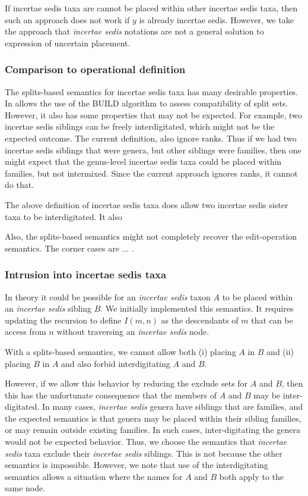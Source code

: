 \documentclass[english]{article}
\begin{document}
If incertae sedis taxa are cannot be placed within other incertae
sedis taxa, then such an approach does not work if $y$ is already
incertae sedis.
However, we take the approach that \emph{incertae
sedis} notations are not a general solution to expression of uncertain
placement.

\subsubsection{Comparison to operational definition}

The splits-based semantics for incertae sedis taxa has many desirable
properties.
In allows the use of the BUILD algorithm to assess
compatibility of split sets.
However, it also has some properties that
may not be expected.
For example, two incertae sedis siblings can be
freely interdigitated, which might not be the expected outcome.
The
current definition, also ignore ranks.
Thus if we had two incertae
sedis siblings that were genera, but other siblings were families,
then one might expect that the genus-level incertae sedis taxa could
be placed within families, but not intermixed.
Since the current
approach ignores ranks, it cannot do that.

The above definition of incertae sedis taxa does allow two incertae
sedis sister taxa to be interdigitated.
It also

Also, the splits-based semantics might not completely recover the
edit-operation semantics.
The corner cases are ...
.

\subsubsection{Intrusion into incertae sedis taxa}

In theory it could be possible for an \emph{incertae sedis} taxon $A$
to be placed within an \emph{incertae sedis} sibling $B$.
We initially
implemented this semantics.
It requires updating the recursion to
define $I(m,n)$ as the descendants of $m$ that can be access from $n$
without traversing an \emph{incertae sedis} node.

With a splits-based semantics, we cannot allow both (i) placing $A$ in
$B$ and (ii) placing $B$ in $A$ and also forbid interdigitating $A$
and $B$.

However, if we allow this behavior by reducing the exclude sets for
$A$ and $B$, then this has the unfortunate consequence that the
members of $A$ and $B$ may be inter-digitated.
In many cases,
\emph{incertae sedis} genera have siblings that are families, and the
expected semantics is that genera may be placed within their sibling
families, or may remain outside existing families.
In such cases,
inter-digitating the genera would not be expected behavior.
Thus, we
choose the semantics that \emph{incertae sedis} taxa exclude their
\emph{incertae sedis} siblings.
This is not because the other
semantics is impossible.
However, we note that use of the
interdigitating semantics allows a situation where the names for $A$
and $B$ both apply to the same node.
\end{document}
